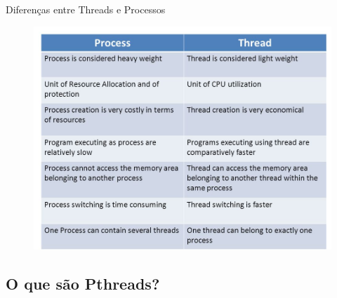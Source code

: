 \documentclass[10pt, xcolor=x11names]{beamer}
\begin{document}

\begin{frame}
	\begin{block}{Diferenças entre Threads e Processos}
		\begin{figure}
		\centering
			\includegraphics[width=.8\linewidth]{img/diff-proc-thre.jpg}
		\end{figure}
	\end{block}
\end{frame}

\subsection{O que são Pthreads?} %
\end{document}
